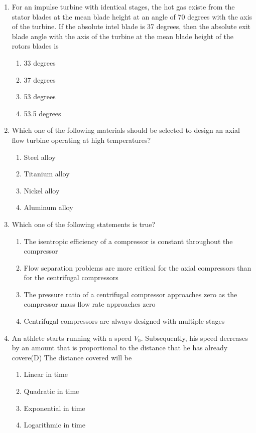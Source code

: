 \documentclass{article}
\begin{document}
\begin{enumerate}
    \item For an impulse turbine with identical stages, the hot gas existe from the stator blades at the mean blade height at an angle of 70 degrees with the axis of the turbine. If the absolute intel blade is 37 degrees, then the absolute exit blade angle with the axis of the turbine at the mean blade height of the rotors blades is
    \begin{multicols}{4}
    \begin{enumerate}
        \item 33 degrees
        \item 37 degrees
        \item 53 degrees
        \item 53.5 degrees
    \end{enumerate}
    \end{multicols}

    \item Which one of the following materials should be selected to design an axial flow turbine operating at high temperatures?
    \begin{multicols}{2}
    \begin{enumerate}
        \item Steel alloy
        \item Titanium alloy
        \item Nickel alloy
        \item Aluminum alloy
    \end{enumerate}
    \end{multicols}
        

    \item Which one of the following statements is true?
    \begin{enumerate}
        \item The isentropic efficiency of a compressor is constant throughout the compressor
        \item Flow separation problems are more critical for the axial compressors than for the centrifugal compressors
        \item The pressure ratio of a centrifugal compressor approaches zero as the compressor mass flow rate approaches zero
        \item Centrifugal compressors are always designed with multiple stages 
    \end{enumerate}
        

    \item An athlete starts running with a speed $V_0$. Subsequently, his speed decreases by an amount that is proportional to the distance that he has already covere(D) The distance covered will be
    \begin{enumerate}
        \item Linear in time
        \item Quadratic in time
        \item Exponential in time
        \item Logarithmic in time 
    \end{enumerate}


\end{enumerate}
\end{document}
